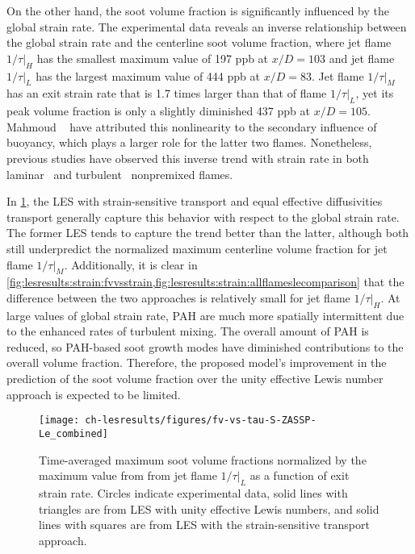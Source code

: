 On the other hand, the soot volume fraction is significantly influenced by the global strain rate. The experimental data reveals an inverse relationship between the global strain rate and the centerline soot volume fraction, where jet flame $1/\tau|_H$ has the smallest maximum value of 197 ppb at $x/D = 103$ and jet flame $1/\tau|_L$ has the largest maximum value of 444 ppb at $x/D = 83$. Jet flame $1/\tau|_M$ has an exit strain rate that is 1.7 times larger than that of flame $1/\tau|_L$, yet its peak volume fraction is only a slightly diminished 437 ppb at $x/D = 105$. Mahmoud \etal~\cite{mahmoud2017} have attributed this nonlinearity to the secondary influence of buoyancy, which plays a larger role for the latter two flames. Nonetheless, previous studies have observed this inverse trend with strain rate in both laminar~\cite{decroix2000,huijnen2010,wang2016433} and turbulent~\cite{kent1984,mahmoud2017} nonpremixed flames.

In \cref{fig:lesresults:strain:fvvsstrain}, the LES with strain-sensitive transport and equal effective diffusivities transport generally capture this behavior with respect to the global strain rate. The former LES tends to capture the trend better than the latter, although both still underpredict the normalized maximum centerline volume fraction for jet flame $1/\tau|_M$. Additionally, it is clear in \cref{fig:lesresults:strain:fvvsstrain,fig:lesresults:strain:allflameslecomparison} that the difference between the two approaches is relatively small for jet flame $1/\tau|_H$. At large values of global strain rate, PAH are much more spatially intermittent due to the enhanced rates of turbulent mixing. The overall amount of PAH is reduced, so PAH-based soot growth modes have diminished contributions to the overall volume fraction. Therefore, the proposed model's improvement in the prediction of the soot volume fraction over the unity effective Lewis number approach is expected to be limited.

\begin{figure}[htb]
  \centering
  \texttt{[image: ch-lesresults/figures/fv-vs-tau-S-ZASSP-Le\_combined]}
  \caption[Normalized Maximum \texorpdfstring{$\langle f_V \rangle$}{<fV>} Versus Exit Strain Rate]{Time-averaged maximum soot volume fractions normalized by the maximum value from from jet flame $1/\tau|_L$ as a function of exit strain rate. Circles indicate experimental data, solid lines with triangles are from LES with unity effective Lewis numbers, and solid lines with squares are from LES with the strain-sensitive transport approach.}
  \label{fig:lesresults:strain:fvvsstrain}
\end{figure}

